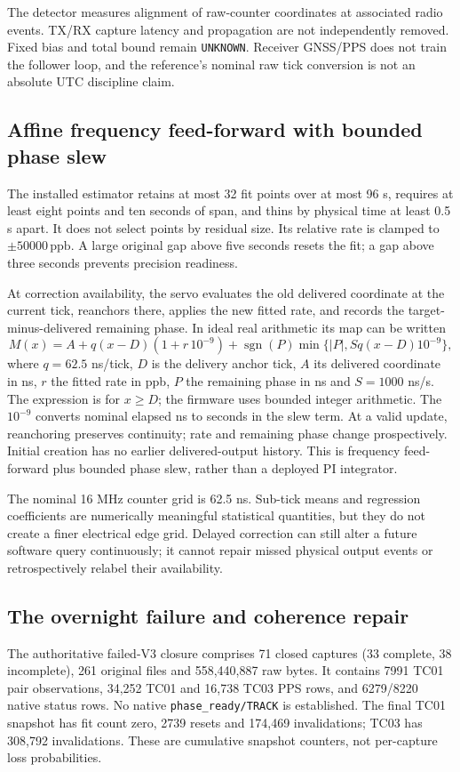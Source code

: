 \documentclass[11pt,letterpaper]{article}
\newcommand{\ppb}{\,\mathrm{ppb}}
\newcommand{\code}[1]{\texttt{\small #1}}
\begin{document}
The detector measures alignment of raw-counter coordinates at associated radio events. TX/RX capture latency and propagation are not independently removed. Fixed bias and total bound remain \code{UNKNOWN}. Receiver GNSS/PPS does not train the follower loop, and the reference's nominal raw tick conversion is not an absolute UTC discipline claim.

\subsection{Affine frequency feed-forward with bounded phase slew}
The installed estimator retains at most 32 fit points over at most 96 s, requires at least eight points and ten seconds of span, and thins by physical time at least 0.5 s apart. It does not select points by residual size. Its relative rate is clamped to $\pm50000\ppb$. A large original gap above five seconds resets the fit; a gap above three seconds prevents precision readiness.

At correction availability, the servo evaluates the old delivered coordinate at the current tick, reanchors there, applies the new fitted rate, and records the target-minus-delivered remaining phase. In ideal real arithmetic its map can be written
\begin{equation}
 M(x)=A+q(x-D)(1+r\,10^{-9})+\operatorname{sgn}(P)\min\{|P|,S q(x-D)10^{-9}\},\label{eq:map}
\end{equation}
where $q=62.5$ ns/tick, $D$ is the delivery anchor tick, $A$ its delivered coordinate in ns, $r$ the fitted rate in ppb, $P$ the remaining phase in ns and $S=1000$ ns/s. The expression is for $x\ge D$; the firmware uses bounded integer arithmetic. The $10^{-9}$ converts nominal elapsed ns to seconds in the slew term. At a valid update, reanchoring preserves continuity; rate and remaining phase change prospectively. Initial creation has no earlier delivered-output history. This is frequency feed-forward plus bounded phase slew, rather than a deployed PI integrator.

The nominal 16 MHz counter grid is 62.5 ns. Sub-tick means and regression coefficients are numerically meaningful statistical quantities, but they do not create a finer electrical edge grid. Delayed correction can still alter a future software query continuously; it cannot repair missed physical output events or retrospectively relabel their availability.

\subsection{The overnight failure and coherence repair}
The authoritative failed-V3 closure comprises 71 closed captures (33 complete, 38 incomplete), 261 original files and 558,440,887 raw bytes. It contains 7991 TC01 pair observations, 34,252 TC01 and 16,738 TC03 PPS rows, and 6279/8220 native status rows. No native \code{phase\_ready/TRACK} is established. The final TC01 snapshot has fit count zero, 2739 resets and 174,469 invalidations; TC03 has 308,792 invalidations. These are cumulative snapshot counters, not per-capture loss probabilities.
\end{document}
